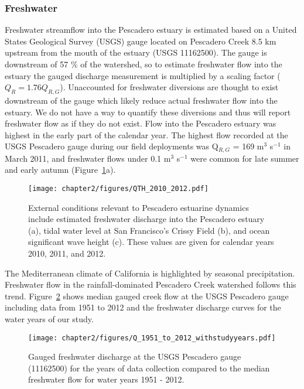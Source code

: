 \subsubsection{Freshwater}
Freshwater streamflow into the Pescadero estuary is estimated based on a United States Geological Survey (USGS) gauge located on Pescadero Creek 8.5 km upstream from the mouth of the estuary (USGS 11162500). The gauge is downstream of 57 \% of the watershed, so to estimate freshwater flow into the estuary the gauged discharge measurement is multiplied by a scaling factor ($Q_R = 1.76Q_{R,G}$). Unaccounted for freshwater diversions are thought to exist downstream of the gauge which likely reduce actual freshwater flow into the estuary. We do not have a way to quantify these diversions and thus will report freshwater flow as if they do not exist. Flow into the Pescadero estuary was highest in the early part of the calendar year. The highest flow recorded at the USGS Pescadero gauge during our field deployments was Q$_{R,G}$ = 169 m$^{3}$ s$^{-1}$ in March 2011, and freshwater flows under 0.1 m$^{3}$ s$^{-1}$ were common for late summer and early autumn (Figure~\ref{fig:QTH_2010_2012}a).


\begin{figure}
	\begin{center}
		\texttt{[image: chapter2/figures/QTH\_2010\_2012.pdf]} \caption{External conditions relevant to Pescadero estuarine dynamics include estimated freshwater discharge into the Pescadero estuary (a), tidal water level at San Francisco's Crissy Field (b), and ocean significant wave height (c). These values are given for calendar years 2010, 2011, and 2012.}\label{fig:QTH_2010_2012}  
	\end{center}
\end{figure}


The Mediterranean climate of California is highlighted by seasonal precipitation. Freshwater flow in the rainfall-dominated Pescadero Creek watershed follows this trend. Figure~\ref{fig:Q_1951_2012} shows median gauged creek flow at the USGS Pescadero gauge including data from 1951 to 2012 and the freshwater discharge curves for the water years of our study. 

\begin{figure}
	\begin{center}
		\texttt{[image: chapter2/figures/Q\_1951\_to\_2012\_withstudyyears.pdf]} \caption{Gauged freshwater discharge at the USGS Pescadero gauge (11162500) for the years of data collection compared to the median freshwater flow for water years 1951 - 2012.}\label{fig:Q_1951_2012}
	\end{center}
\end{figure}

